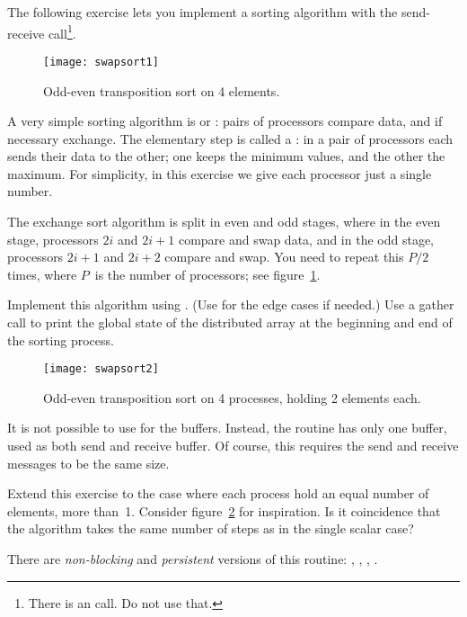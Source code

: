The following exercise lets you implement a sorting algorithm with the
send-receive call\footnote {There is an 
  call. Do not use that.}.

\begin{figure}[ht]
  \texttt{[image: swapsort1]}
  \caption{Odd-even transposition sort on 4 elements.}
  \label{fig:swapsort1}
\end{figure}

\begin{exercise}
  \label{ex:exchangesort}
  A very simple sorting algorithm is  or
  :
  pairs of processors compare data, and if necessary exchange. The
  elementary step is called a : in a pair
  of processors each sends their data to the other; one keeps the
  minimum values, and the other the maximum.
  For simplicity, in this exercise we give each processor just a single number.

  The exchange sort algorithm is split in even and odd stages, where
  in the even stage, processors $2i$ and $2i+1$ compare and swap data,
  and in the odd stage, processors $2i+1$ and $2i+2$ compare and swap.
  You need to repeat this $P/2$ times, where $P$~is the number of
  processors; see figure~\ref{fig:swapsort1}.

  Implement this algorithm using . (Use
   for the edge cases if needed.)
  Use a gather call to print the global state of the distributed array
  at the beginning and end of the sorting process.
\end{exercise}

\begin{figure}[ht]
  \texttt{[image: swapsort2]}
  \caption{Odd-even transposition sort on 4 processes, holding 2 elements each.}
  \label{fig:swapsort2}
\end{figure}

\begin{remark}
  It is not possible to use  for the buffers.
  Instead, the routine  has only one buffer,
  used as both send and receive buffer.
  Of course, this requires the send and receive messages to be the same size.
\end{remark}

\begin{exercise}
  Extend this exercise to the case where each process hold an equal
  number of elements, more than~1. Consider figure~\ref{fig:swapsort2}
  for inspiration. Is it coincidence that the algorithm takes the same
  number of steps as in the single scalar case?
\end{exercise}

\begin{mpifour}
  There are
  \emph{non-blocking}
  and
  \emph{persistent}
  versions of this routine:
  , ,
  , .
\end{mpifour}
